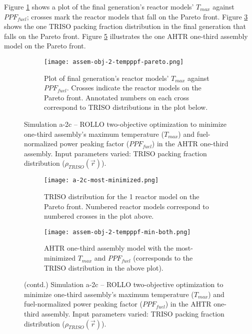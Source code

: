 Figure \ref{fig:assem-obj-2-tempppf-pareto} shows a plot of the final generation's reactor 
models' $T_{max}$ against $PPF_{fuel}$; crosses mark the reactor models that fall on 
the Pareto front.
Figure \ref{fig:assem-obj-2-tempppf-pareto-distr} shows the one TRISO packing fraction 
distribution in the final generation that falls on the Pareto front. 
Figure \ref{fig:assem-obj-2-tempppf-min-tempppf} illustrates the one \gls{AHTR} one-third 
assembly model on the Pareto front. 
\begin{figure}[htbp!]
    \centering
    \begin{subfigure}{\textwidth}
        \texttt{[image: assem-obj-2-tempppf-pareto.png]}
        \caption{Plot of final generation's reactor models' $T_{max}$ against 
        $PPF_{fuel}$. 
        Crosses indicate the reactor models on the Pareto front. Annotated numbers 
        on each cross correspond to TRISO distributions in the plot below.}
        \label{fig:assem-obj-2-tempppf-pareto} 
    \end{subfigure}
    \caption{Simulation a-2c -- ROLLO two-objective optimization to minimize 
    one-third assembly's maximum temperature ($T_{max}$) and fuel-normalized power peaking factor 
    ($PPF_{fuel}$) in the \gls{AHTR} one-third assembly. 
    Input parameters varied: TRISO packing fraction distribution ($\rho_{TRISO}(\vec{r})$).}
    \label{fig:assem-obj-2-tempppf}
\end{figure}
\begin{figure}[htbp!]
    \ContinuedFloat
    \begin{subfigure}{\textwidth}
        \centering
        \texttt{[image: a-2c-most-minimized.png]}
        \caption{TRISO distribution for the 1 reactor model on the Pareto front.
        Numbered reactor models correspond to numbered crosses in the plot above. }
        \label{fig:assem-obj-2-tempppf-pareto-distr} 
    \end{subfigure}
    \begin{subfigure}{\textwidth}
        \centering
        \texttt{[image: assem-obj-2-tempppf-min-both.png]}
        \caption{\gls{AHTR} one-third assembly model with the most-minimized $T_{max}$ and 
        $PPF_{fuel}$ (corresponds to the TRISO distribution in the above plot).}
        \label{fig:assem-obj-2-tempppf-min-tempppf} 
    \end{subfigure}
    \caption{(contd.) Simulation a-2c -- ROLLO two-objective optimization to minimize 
    one-third assembly's maximum temperature ($T_{max}$) and fuel-normalized power peaking factor 
    ($PPF_{fuel}$) in the \gls{AHTR} one-third assembly. 
    Input parameters varied: TRISO packing fraction distribution ($\rho_{TRISO}(\vec{r})$).}
\end{figure}

